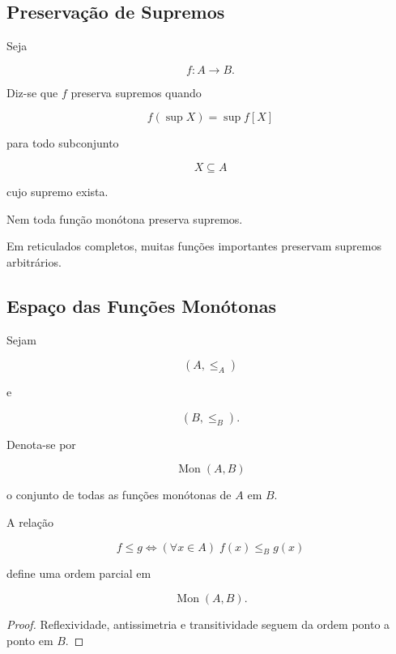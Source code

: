 \documentclass[../../main]{subfiles}
\begin{document}
\subsection{Preservação de Supremos}

\begin{defn}
	\label{def:matematica:funcoes:ordem:supremo}

	Seja

	\[
		f:A\to B.
	\]

	Diz-se que \(f\) preserva supremos quando

	\[
		f(\sup X)
		=
		\sup f[X]
	\]

	para todo subconjunto

	\[
		X\subseteq A
	\]

	cujo supremo exista.

\end{defn}

\begin{obs}

	Nem toda função monótona preserva supremos.

\end{obs}

\begin{ex}

	Em reticulados completos, muitas funções importantes preservam
	supremos arbitrários.

\end{ex}

\subsection{Espaço das Funções Monótonas}

\begin{defn}
	\label{def:matematica:funcoes:ordem:espaco-monotono}

	Sejam

	\[
		(A,\le_A)
	\]

	e

	\[
		(B,\le_B).
	\]

	Denota-se por

	\[
		\operatorname{Mon}(A,B)
	\]

	o conjunto de todas as funções monótonas de \(A\) em \(B\).

\end{defn}

\begin{prop}
	\label{prop:matematica:funcoes:ordem:ordem-ponto-a-ponto}

	A relação

	\[
		f\le g
		\iff
		(\forall x\in A)
		\;
		f(x)\le_B g(x)
	\]

	define uma ordem parcial em

	\[
		\operatorname{Mon}(A,B).
	\]

\end{prop}

\begin{proof}

	Reflexividade, antissimetria e transitividade seguem da ordem
	ponto a ponto em \(B\).

\end{proof}
\end{document}
